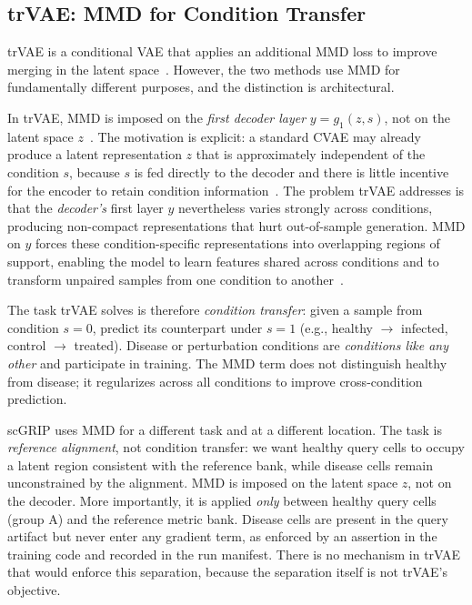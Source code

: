 \documentclass[12pt, a4paper]{article}
\begin{document}
\subsection{trVAE: MMD for Condition Transfer}

trVAE is a conditional VAE that applies an additional MMD loss to improve merging in the latent space~\cite{trvae_2020,scarches_trvae}. However, the two methods use MMD for fundamentally different purposes, and the distinction is architectural.

In trVAE, MMD is imposed on the \emph{first decoder layer} \(y = g_1(z, s)\), not on the latent space \(z\)~\cite{trvae_2020}. The motivation is explicit: a standard CVAE may already produce a latent representation \(z\) that is approximately independent of the condition \(s\), because \(s\) is fed directly to the decoder and there is little incentive for the encoder to retain condition information~\cite{trvae_arxiv}. The problem trVAE addresses is that the \emph{decoder's} first layer \(y\) nevertheless varies strongly across conditions, producing non-compact representations that hurt out-of-sample generation. MMD on \(y\) forces these condition-specific representations into overlapping regions of support, enabling the model to learn features shared across conditions and to transform unpaired samples from one condition to another~\cite{trvae_arxiv,trvae_bioinformatics}.

The task trVAE solves is therefore \emph{condition transfer}: given a sample from condition \(s=0\), predict its counterpart under \(s=1\) (e.g., healthy \(\to\) infected, control \(\to\) treated). Disease or perturbation conditions are \emph{conditions like any other} and participate in training. The MMD term does not distinguish healthy from disease; it regularizes across all conditions to improve cross-condition prediction.

scGRIP uses MMD for a different task and at a different location. The task is \emph{reference alignment}, not condition transfer: we want healthy query cells to occupy a latent region consistent with the reference bank, while disease cells remain unconstrained by the alignment. MMD is imposed on the latent space \(z\), not on the decoder. More importantly, it is applied \emph{only} between healthy query cells (group A) and the reference metric bank. Disease cells are present in the query artifact but never enter any gradient term, as enforced by an assertion in the training code and recorded in the run manifest. There is no mechanism in trVAE that would enforce this separation, because the separation itself is not trVAE's objective.
\end{document}
